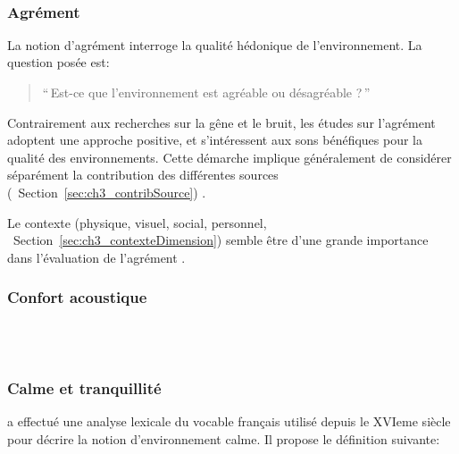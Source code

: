 {\\


\subsubsection{Agrément}

La notion d'agrément interroge la qualité hédonique de l'environnement. La question posée est:

\begin{quote}
``\,Est-ce que l'environnement est agréable ou désagréable ?\,''
\end{quote}
 
Contrairement aux recherches sur la gêne et le bruit, les études sur l'agrément adoptent une approche positive, et s'intéressent aux sons bénéfiques pour la qualité des environnements. Cette démarche implique généralement de considérer séparément la contribution des différentes sources (\cf~Section~\ref{sec:ch3_contribSource})  \citep{lavandier2006contribution,garcia2012validation}.

Le contexte (physique, visuel, social, personnel, \cf~Section~\ref{sec:ch3_contexteDimension}) semble être d'une grande importance dans l'évaluation de l'agrément \citep{guillen2007importance}.


\subsubsection{Confort acoustique}
\label{sec:ch3_confort}


\\
\\

\subsubsection{Calme et tranquillité}

\citep{delaitre2012definition} a effectué une analyse lexicale du vocable français utilisé depuis le XVIeme siècle pour décrire la notion d'environnement calme. Il propose le définition suivante:

}

